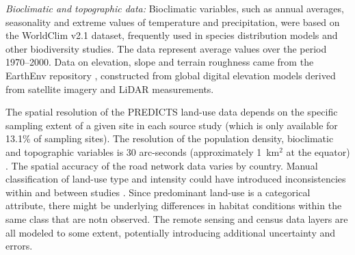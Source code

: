 \textit{Bioclimatic and topographic data:} Bioclimatic variables, such as annual averages, seasonality and extreme values of temperature and precipitation, were based on the WorldClim v2.1 dataset\cite{fick2017}, frequently used in species distribution models and other biodiversity studies. The data represent average values over the period 1970--2000. Data on elevation, slope and terrain roughness came from the EarthEnv repository \cite{amatulli2018}, constructed from global digital elevation models derived from satellite imagery and LiDAR measurements.

The spatial resolution of the PREDICTS land-use data depends on the specific sampling extent of a given site in each source study \cite{hudson2017} (which is only available for 13.1\% of sampling sites). The resolution of the population density, bioclimatic and topographic variables is 30 arc-seconds (approximately 1~km$^2$ at the equator) \cite{gpw2017,fick2017, amatulli2018}. The spatial accuracy of the road network data varies by country\cite{groads2013}. Manual classification of land-use type and intensity could have introduced inconsistencies within and between studies \cite{hudson2017}. Since predominant land-use is a categorical attribute, there might be underlying differences in habitat conditions within the same class that are notn observed. The remote sensing and census data layers are all modeled to some extent, potentially introducing additional uncertainty and errors.
\vspace{\baselineskip}
